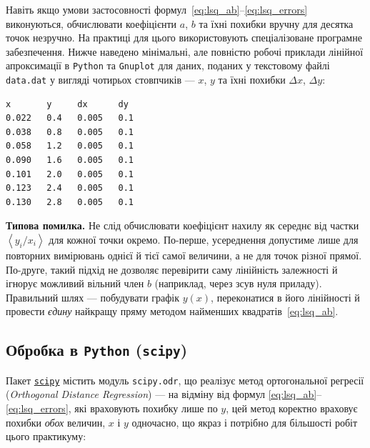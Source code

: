Навіть якщо умови застосовності формул~\eqref{eq:lsq_ab}--\eqref{eq:lsq_errors} виконуються, обчислювати
коефіцієнти $a$, $b$ та їхні похибки вручну для десятка
точок незручно. На практиці для
цього використовують спеціалізоване програмне забезпечення. Нижче
наведено мінімальні, але повністю робочі приклади лінійної
апроксимації в \texttt{Python} та \texttt{Gnuplot} для даних, поданих
у текстовому файлі \texttt{data.dat} у вигляді чотирьох стовпчиків
--- $x$, $y$ та їхні похибки $\Delta x$, $\Delta y$:

\bgroup
\begin{verbatim}
x       y     dx      dy
0.022   0.4   0.005   0.1
0.038   0.8   0.005   0.1
0.058   1.2   0.005   0.1
0.090   1.6   0.005   0.1
0.101   2.0   0.005   0.1
0.123   2.4   0.005   0.1
0.130   2.8   0.005   0.1
\end{verbatim}
\egroup

\begin{Warning}
	\textbf{Типова помилка.} Не слід обчислювати коефіцієнт нахилу як
	середнє від частки $\left\langle y_i/x_i \right\rangle$ для кожної
	точки окремо. По-перше, усереднення допустиме лише для повторних
	вимірювань однієї й тієї самої величини, а не для точок різної
	прямої. По-друге, такий підхід не дозволяє перевірити саму лінійність
	залежності й ігнорує можливий вільний член $b$ (наприклад, через
	зсув нуля приладу). Правильний шлях --- побудувати графік $y(x)$,
	переконатися в його лінійності й провести \emph{єдину} найкращу
	пряму методом найменших квадратів~\eqref{eq:lsq_ab}.
\end{Warning}

\subsection{Обробка в \texttt{Python} (\texttt{scipy})}

Пакет \href{https://scipy.org}{\texttt{scipy}} містить модуль
\texttt{scipy.odr}, що реалізує метод ортогональної регресії
(\emph{Orthogonal Distance Regression}) --- на відміну від формул
\eqref{eq:lsq_ab}--\eqref{eq:lsq_errors}, які враховують похибку лише
по $y$, цей метод коректно враховує похибки \emph{обох} величин, $x$
і $y$ одночасно, що якраз і потрібно для більшості робіт цього
практикуму:


